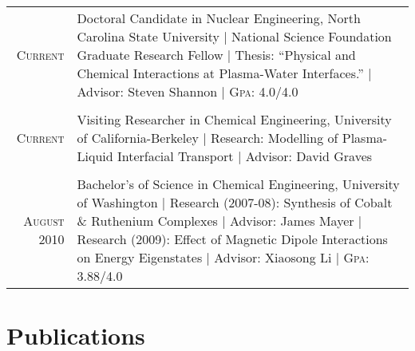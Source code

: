 \documentclass[a4paper,10pt]{article} %
\begin{document}
\begin{table}[h]
\begin{tabularx}{\textwidth}{rX}	

\textsc{Current} & Doctoral Candidate in Nuclear Engineering, North Carolina State University | National Science Foundation Graduate Research Fellow | Thesis: ``Physical and Chemical Interactions at Plasma-Water Interfaces.'' | Advisor: Steven Shannon | \textsc{Gpa}: 4.0/4.0\\
&\\


\textsc{Current} & Visiting Researcher in Chemical Engineering, University of California-Berkeley | Research: Modelling of Plasma-Liquid Interfacial Transport | Advisor: David Graves\\
&\\


\textsc{August} 2010 & Bachelor's of Science in Chemical Engineering, University of Washington | Research (2007-08): Synthesis of Cobalt \& Ruthenium Complexes | Advisor: James Mayer | Research (2009): Effect of Magnetic Dipole Interactions on Energy Eigenstates | Advisor: Xiaosong Li | \textsc{Gpa}: 3.88/4.0\\ 

\end{tabularx}
\end{table}


\section{Publications}
\end{document}
